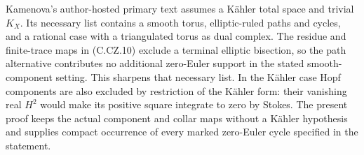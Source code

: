 Kamenova's author-hosted primary text
\cite[Theorem 3.1]{KamenovaTori} assumes a
K\"ahler total space and trivial $K_X$.
Its necessary list contains a smooth torus,
elliptic-ruled paths and cycles, and a rational
case with a triangulated torus as dual complex.
The residue and finite-trace maps in
(C.CZ.10) exclude a terminal elliptic bisection,
so the path alternative contributes no
additional zero-Euler support in the stated
smooth-component setting. This sharpens that
necessary list. In the K\"ahler case Hopf
components are also excluded by restriction
of the K\"ahler form: their vanishing real
$H^2$ would make its positive square integrate
to zero by Stokes. The present proof keeps
the actual component and collar maps without
a K\"ahler hypothesis and supplies compact
occurrence of every marked zero-Euler cycle
specified in the statement.

